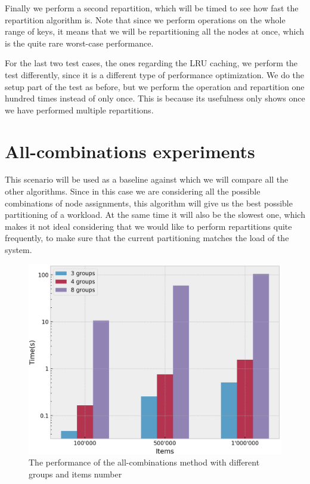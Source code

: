 Finally we perform a second repartition, which will be timed to see how fast the repartition algorithm is. Note that since we perform operations on the whole range of keys, it means that we will be repartitioning all the nodes at once, which is the quite rare worst-case performance.

For the last two test cases, the ones regarding the LRU caching, we perform the test differently, since it is a different type of performance optimization. We do the setup part of the test as before, but we perform the operation and repartition one hundred times instead of only once. This is because its usefulness only shows once we have performed multiple repartitions.


\section{All-combinations experiments}\label{sec:All-combinations}
This scenario will be used as a baseline against which we will compare all the other algorithms. Since in this case we are considering all the possible combinations of node assignments, this algorithm will give us the best possible partitioning of a workload. At the same time it will also be the slowest one, which makes it not ideal considering that we would like to perform repartitions quite frequently, to make sure that the current partitioning matches the load of the system.

\begin{figure}[!htb]
  \centering
  \includegraphics[width=\textwidth,height=\textheight,keepaspectratio]{img/all.png}
  \caption{The performance of the all-combinations method with different groups and items number}
  \label{fig:all}
\end{figure}

